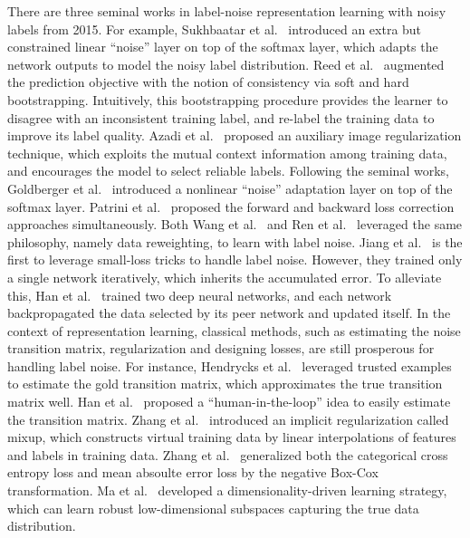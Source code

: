 There are three seminal works in label-noise representation learning with noisy labels from 2015. For example, Sukhbaatar et al.~ introduced an extra but constrained linear ``noise'' layer on top of the softmax layer, which adapts the network outputs to model the noisy label distribution. Reed et al.~ augmented the prediction objective with the notion of consistency via soft and hard bootstrapping. Intuitively, this bootstrapping procedure provides the learner to disagree with an inconsistent training label, and re-label the training data to improve its label quality. Azadi et al.~ proposed an auxiliary image regularization technique, which exploits the mutual context information among training data, and encourages the model to select reliable labels.
Following the seminal works, Goldberger et al.~ introduced a nonlinear ``noise'' adaptation layer on top of the softmax layer. Patrini et al.~ proposed the forward and backward loss correction approaches simultaneously. Both Wang et al.~ and Ren et al.~ leveraged the same philosophy, namely data reweighting, to learn with label noise. Jiang et al.~ is the first to leverage small-loss tricks to handle label noise. However, they trained only a single network iteratively, which inherits the accumulated error. To alleviate this, Han et al.~ trained two deep neural networks, and each network backpropagated the data selected by its peer network and updated itself.
In the context of representation learning, classical methods, such as estimating the noise transition matrix, regularization and designing losses, are still prosperous for handling label noise. For instance, Hendrycks et al.~ leveraged trusted examples to estimate the gold transition matrix, which approximates the true transition matrix well. Han et al.~ proposed a ``human-in-the-loop'' idea to easily estimate the transition matrix. Zhang et al.~ introduced an implicit regularization called mixup, which constructs virtual training data by linear interpolations of features and labels in training data. Zhang et al.~ generalized both the categorical cross entropy loss and mean absoulte error loss by the negative Box-Cox transformation. Ma et al.~ developed a dimensionality-driven learning strategy, which can learn robust low-dimensional subspaces capturing the true data distribution.

